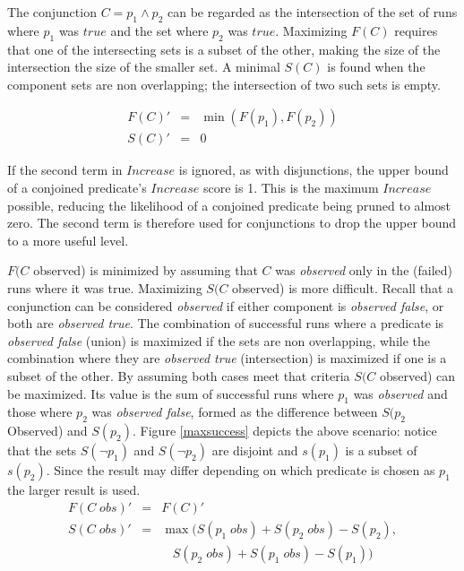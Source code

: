 The conjunction $C = p_1 \wedge p_2$ can be regarded as the intersection of the set of runs where $p_1$ was $true$ and the set where $p_2$ was $true$.  Maximizing $F(C)$ requires that one of the intersecting sets is a subset of the other, making the size of the intersection the size of the smaller set.  A minimal $S(C)$ is found when the component sets are non overlapping; the intersection of two such sets is empty.

\begin{eqnarray}
 \nonumber %
  F(C)' &=&  \min(F(p_1),F(p_2)) \\
 \nonumber
  S(C)' &=& 0
\end{eqnarray}

If the second term in $Increase$ is ignored, as with disjunctions, the upper bound of a conjoined predicate's $Increase$ score is 1.  This is the maximum $Increase$ possible, reducing the likelihood of a conjoined predicate being pruned to almost zero.  The second term is therefore used for conjunctions to drop the upper bound to a more useful level.

$F(C$ observed) is minimized by assuming that $C$ was \textit{observed} only in the (failed) runs where it was true.  Maximizing $S(C$ observed) is more difficult.  Recall that a conjunction can be considered \textit{observed} if either component is \textit{observed false}, or both are \textit{observed true}.  The combination of successful runs where a predicate is \textit{observed false} (union) is maximized if the sets are non overlapping, while the combination where they are \textit{observed true} (intersection) is maximized if one is a subset of the other.  By assuming both cases meet that criteria $S(C$ observed) can be maximized.  Its value is the sum of successful runs where $p_1$ was \textit{observed} and those where $p_2$ was \textit{observed false}, formed as the difference between $S(p_2$  Observed) and $S(p_2)$. Figure \ref{maxsuccess} depicts the above scenario: notice that the sets $S(\neg p_1)$ and $S(\neg p_2)$ are disjoint and $s(p_1)$ is a subset of $s(p_2)$.  Since the result may differ depending on which predicate is chosen as $p_1$ the larger result is used.
\begin{eqnarray}
 \nonumber
  F(C\;obs)' &=& F(C)' \\
 \nonumber
  S(C\;obs)' &=&
  \max(S(p_1\;obs)+S(p_2\;obs)-S(p_2),\\
 \nonumber
  & &\ \ \ \ S(p_2\;obs)+S(p_1\;obs)-S(p_1))
\end{eqnarray}

